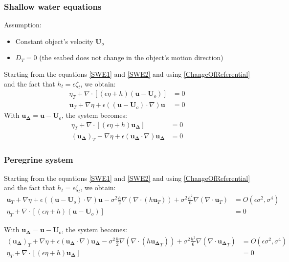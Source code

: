 \documentclass[11pt,a4paper]{article}
\begin{document}
		\subsubsection{Shallow water equations}
		Assumption: 
		\begin{itemize}
			\item Constant object's velocity $\mathbf{U}_o$
			\item $D_T = 0$ (the seabed does not change in the object's motion direction)
		\end{itemize}
		Starting from the equations \eqref{SWE1} and \eqref{SWE2} and using \eqref{ChangeOfReferential} and the fact that $h_t = \epsilon \zeta_t$, we obtain:
		\begin{align}
			\eta_T + \nabla \cdot [(\epsilon \eta + h)(\mathbf{u} - \mathbf{U}_o)] &= 0 \\
			\mathbf{u}_T + \nabla \eta		+ \epsilon ((\mathbf{u} - \mathbf{U}_o)\cdot \nabla) \mathbf{u} &= 0
		\end{align}
		With $\mathbf{u_\Delta} = \mathbf{u} - \mathbf{U}_o$, the system becomes:
		\begin{align}
			\eta_T + \nabla \cdot [(\epsilon \eta + h)\mathbf{u_\Delta}] &= 0 \\
			(\mathbf{u_\Delta})_T + \nabla \eta		+ \epsilon (\mathbf{u_\Delta}\cdot \nabla) \mathbf{u_\Delta} &= 0
		\end{align}
		
		
		\pagebreak
		
		\subsubsection{Peregrine system}
			Starting from the equations \eqref{SWE1} and \eqref{SWE2} and using \eqref{ChangeOfReferential} and the fact that $h_t = \epsilon \zeta_t$, we obtain:
			\begin{align}
				\mathbf{u}_T + \nabla \eta		+ \epsilon ((\mathbf{u} - \mathbf{U}_o)\cdot \nabla) \mathbf{u}  - \sigma^2\frac{h}{2}\nabla (\nabla \cdot (h \mathbf{u}_T)) + \sigma^2 \frac{h^2}{6}\nabla (\nabla \cdot \mathbf{u}_T) &= O(\epsilon \sigma^2, \sigma^4)\\
				\eta_T + \nabla \cdot [(\epsilon \eta + h)(\mathbf{u} - \mathbf{U}_o)] &= 0
	\end{align}
	
		With $\mathbf{u_\Delta} = \mathbf{u} - \mathbf{U}_o$, the system becomes:
		\begin{align}
			(\mathbf{u_\Delta})_T + \nabla \eta		+ \epsilon (\mathbf{u_\Delta}\cdot \nabla) \mathbf{u_\Delta} - \sigma^2\frac{h}{2}\nabla (\nabla \cdot (h \mathbf{u_\Delta}_T)) + \sigma^2 \frac{h^2}{6}\nabla (\nabla \cdot \mathbf{u_\Delta}_T) &= O(\epsilon \sigma^2, \sigma^4)\\
			\eta_T + \nabla \cdot [(\epsilon \eta + h)\mathbf{u_\Delta}] &= 0
		\end{align}			
			
\end{document}
